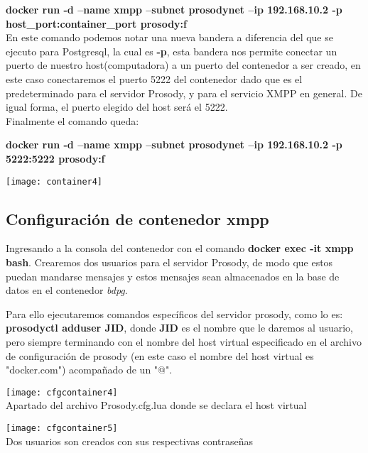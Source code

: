 \documentclass[10pt,letterpaper]{article}
\begin{document}
\textbf{docker run -d --name xmpp --subnet prosodynet --ip 192.168.10.2 -p host\_port:container\_port prosody:f}\\

En este comando podemos notar una nueva bandera a diferencia del que se ejecuto para Postgresql, la cual es \textbf{-p}, esta bandera nos permite conectar un puerto de nuestro host(computadora) a un puerto del contenedor a ser creado, en este caso conectaremos el puerto 5222 del contenedor dado que es el predeterminado para el servidor Prosody, y para el servicio XMPP en general. De igual forma, el puerto elegido del host será el 5222.\\

Finalmente el comando queda:

\textbf{docker run -d --name xmpp --subnet prosodynet --ip 192.168.10.2 -p 5222:5222 prosody:f}\\

\begin{center}
\texttt{[image: container4]}
\end{center}

\subsection{Configuración de contenedor xmpp}

Ingresando a la consola del contenedor con el comando \textbf{docker exec -it xmpp bash}. Crearemos dos usuarios para el servidor Prosody, de modo que estos puedan mandarse mensajes y estos mensajes sean almacenados en la base de datos en el contenedor \textit{bdpg}.

Para ello ejecutaremos comandos específicos del servidor prosody, como lo es: \textbf{prosodyctl adduser JID}, donde \textbf{JID} es el nombre que le daremos al usuario, pero siempre terminando con el nombre del host virtual  especificado en el archivo de configuración de prosody (en este caso el nombre del host virtual es "docker.com") acompañado de un "@".

\begin{center}
\texttt{[image: cfgcontainer4]}\\
Apartado del archivo Prosody.cfg.lua donde se declara el host virtual
\end{center}

\begin{center}
\texttt{[image: cfgcontainer5]}\\
Dos usuarios son creados con sus respectivas contraseñas
\end{center}
\end{document}
